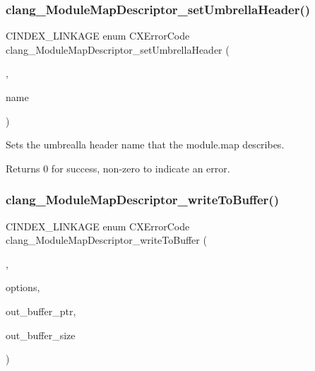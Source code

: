 \subsubsection{\texorpdfstring{clang\+\_\+\+Module\+Map\+Descriptor\+\_\+set\+Umbrella\+Header()}{clang\_ModuleMapDescriptor\_setUmbrellaHeader()}}
{\footnotesize\ttfamily C\+I\+N\+D\+E\+X\+\_\+\+L\+I\+N\+K\+A\+GE enum C\+X\+Error\+Code clang\+\_\+\+Module\+Map\+Descriptor\+\_\+set\+Umbrella\+Header (\begin{DoxyParamCaption}\item[{\mbox{\hyperlink{group__BUILD__SYSTEM_ga8d7eea7855a8d1118218c7661469b3db}{C\+X\+Module\+Map\+Descriptor}}}]{,  }\item[{const char $\ast$}]{name }\end{DoxyParamCaption})}



Sets the umbrealla header name that the module.\+map describes. 

\begin{DoxyReturn}{Returns}
0 for success, non-\/zero to indicate an error. 
\end{DoxyReturn}
\mbox{\label{group__BUILD__SYSTEM_gacaeaf475a29b16a041641b6ebe9a012d}} 
\subsubsection{\texorpdfstring{clang\+\_\+\+Module\+Map\+Descriptor\+\_\+write\+To\+Buffer()}{clang\_ModuleMapDescriptor\_writeToBuffer()}}
{\footnotesize\ttfamily C\+I\+N\+D\+E\+X\+\_\+\+L\+I\+N\+K\+A\+GE enum C\+X\+Error\+Code clang\+\_\+\+Module\+Map\+Descriptor\+\_\+write\+To\+Buffer (\begin{DoxyParamCaption}\item[{\mbox{\hyperlink{group__BUILD__SYSTEM_ga8d7eea7855a8d1118218c7661469b3db}{C\+X\+Module\+Map\+Descriptor}}}]{,  }\item[{unsigned}]{options,  }\item[{char $\ast$$\ast$}]{out\+\_\+buffer\+\_\+ptr,  }\item[{unsigned $\ast$}]{out\+\_\+buffer\+\_\+size }\end{DoxyParamCaption})}



